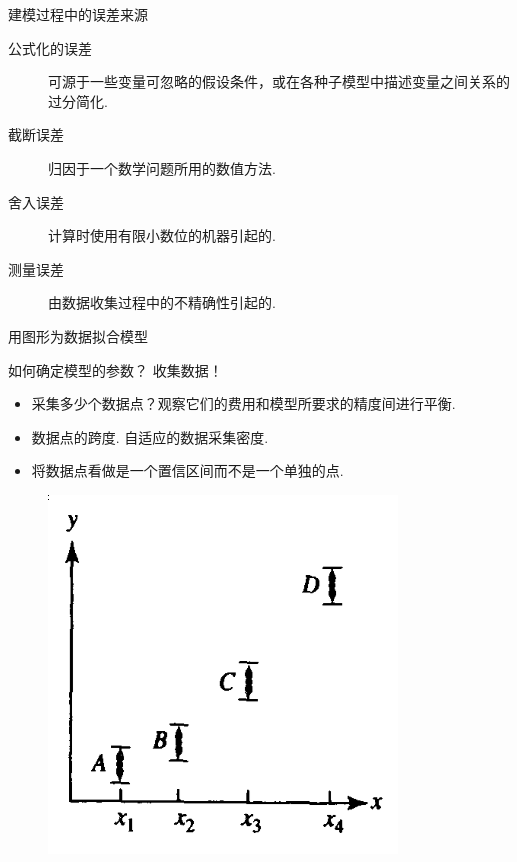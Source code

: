\documentclass[mathserif]{beamer}
\begin{document}
\begin{frame}{建模过程中的误差来源}

  \begin{description}
  \item[公式化的误差] 可源于一些变量可忽略的假设条件，或在各种子模型中描述变量之间关系的过分简化.
  \item[截断误差] 归因于一个数学问题所用的数值方法.
  \item[舍入误差] 计算时使用有限小数位的机器引起的.
  \item[测量误差] 由数据收集过程中的不精确性引起的.
  \end{description}

\end{frame}

\begin{frame}{用图形为数据拟合模型}

  如何确定模型的参数？ 收集数据！

  \begin{itemize}
  \item 采集多少个数据点？观察它们的费用和模型所要求的精度间进行平衡.
  \item 数据点的跨度. 自适应的数据采集密度.
  \item 将数据点看做是一个置信区间而不是一个单独的点.
  \end{itemize}
  
  \begin{figure}
    \centering
    \includegraphics[height=.4\textheight{}]{confid.png}
  \end{figure}
  
\end{frame}
\end{document}
